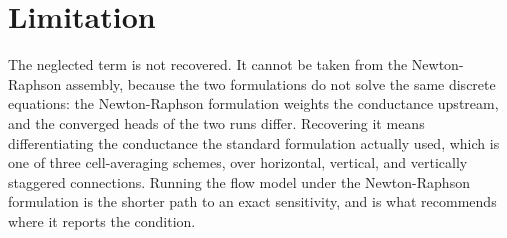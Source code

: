 \section*{Limitation}

The neglected term is not recovered. It cannot be taken from the Newton-Raphson assembly, because the two formulations do not solve the same discrete equations: the Newton-Raphson formulation weights the conductance upstream, and the converged heads of the two runs differ. Recovering it means differentiating the conductance the standard formulation actually used, which is one of three cell-averaging schemes, over horizontal, vertical, and vertically staggered connections. Running the flow model under the Newton-Raphson formulation is the shorter path to an exact sensitivity, and is what \adj{} recommends where it reports the condition.
